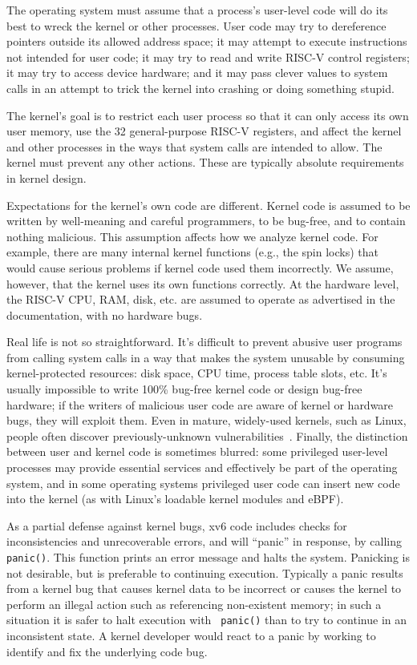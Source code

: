 The operating system must assume that a process's user-level code will
do its best to wreck the kernel or other processes. User code may try
to dereference pointers outside its allowed address space; it may
attempt to execute instructions not intended
for user code; it may try to read and write RISC-V control
registers; it may try to access device hardware;
and it may pass clever values to system calls in an attempt
to trick the kernel into crashing or doing something stupid.

The
kernel's goal is to restrict each user process so that it can only
access its own user memory, use the 32 general-purpose
RISC-V registers, and affect the kernel and other processes in the
ways that system calls are intended to allow. The kernel must prevent
any other actions. These are typically absolute requirements in kernel
design.

Expectations for the kernel's own code are different. Kernel
code is assumed to be written by well-meaning and careful programmers,
to be bug-free, and to contain
nothing malicious. This assumption affects how we analyze kernel code.
For example, there are many internal kernel functions (e.g., the spin
locks) that would cause serious problems if kernel code used them
incorrectly. We assume,
however, that the kernel uses its own functions correctly.
At the hardware level, the RISC-V CPU, RAM, disk, etc. are
assumed to operate as advertised in the documentation, with no
hardware bugs.

Real life is not so straightforward. It's
difficult to prevent abusive user programs from 
calling system calls in a way that makes the system unusable
by consuming kernel-protected resources:
disk space, CPU time, process table slots, etc. It's usually
impossible to write 100\% bug-free kernel code or design bug-free hardware; if the
writers of malicious user code are aware of kernel or hardware bugs,
they will exploit them. Even in mature, widely-used kernels, such as
Linux, people often discover previously-unknown
vulnerabilities~\cite{mitre:cves}.
Finally, the distinction between
user and kernel code is sometimes blurred: some privileged user-level
processes may provide essential services and effectively be part of
the operating system, and in some operating systems privileged user
code can insert new code into the kernel (as with Linux's loadable
kernel modules and eBPF).

As a partial defense against kernel bugs, xv6 code includes checks for
inconsistencies and unrecoverable errors, and will ``panic'' in
response, by calling {\tt panic()}. This function prints an error
message and halts the system. Panicking is not desirable, but is
preferable to continuing execution. Typically a panic results from a
kernel bug that causes kernel data to be incorrect or causes the
kernel to perform an illegal action such as referencing non-existent
memory; in such a situation it is safer to halt execution with {\tt
  panic()} than to try to continue in an inconsistent state. A kernel
developer would react to a panic by working to identify and fix the
underlying code bug.

